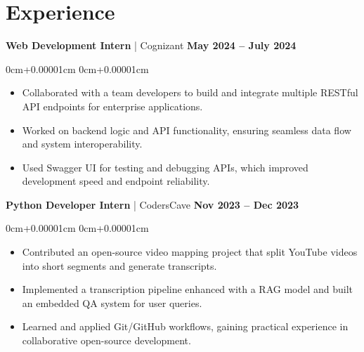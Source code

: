 \documentclass[10pt,a4paper]{article}
\newenvironment{highlights}{
    \begin{itemize}[
        topsep=0.10cm,
        parsep=0.10cm,
        partopsep=0pt,
        itemsep=0pt,
        leftmargin=10pt,
    ]
    }{
    \end{itemize}
}
\newenvironment{onecolentry}{
    \begin{adjustwidth}{
        0cm+0.00001cm
    }{
        0cm+0.00001cm
    }
    }{
    \end{adjustwidth}
}
\begin{document}
    \section{Experience}\label{sec:experience}

    \textbf{Web Development Intern} | Cognizant \hfill \textbf{May 2024 – July 2024}
    \begin{onecolentry}
        \begin{highlights}
            \vspace{0.01cm}
            \item Collaborated with a team developers to build and integrate multiple RESTful API endpoints for enterprise applications.
            \item Worked on backend logic and API functionality, ensuring seamless data flow and system interoperability.
            \item Used Swagger UI for testing and debugging APIs, which improved development speed and endpoint reliability.
        \end{highlights}
    \end{onecolentry}
    \vspace{0.1cm}
    \textbf{Python Developer Intern} | CodersCave \hfill \textbf{Nov 2023 – Dec 2023}
    \begin{onecolentry}
        \begin{highlights}
            \vspace{0.01cm}
            \item Contributed an open-source video mapping project that split YouTube videos into short segments and generate transcripts.
            \item Implemented a transcription pipeline enhanced with a RAG model and built an embedded QA system for user queries.
            \item Learned and applied Git/GitHub workflows, gaining practical experience in collaborative open-source development.
        \end{highlights}
    \end{onecolentry}
\end{document}
